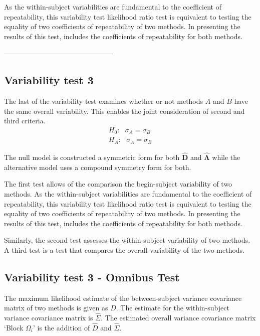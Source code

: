 \documentclass[12pt, a4paper]{report}
\theoremstyle{plain}
\theoremstyle{definition}
\theoremstyle{remark}
\begin{document}
As the within-subject variabilities are fundamental to the coefficient of repeatability, this variability test likelihood ratio test is equivalent to testing the equality of two coefficients of repeatability of two methods. In presenting the results of this test, \citet{roy} includes the coefficients of repeatability for both methods.

-----------------------------------------------%
\subsection{Variability test 3}
The last of the variability test examines whether or not methods $A$ and $B$ have the same overall variability. This enables the joint consideration of second and third criteria.
\begin{eqnarray*}
	H_{0}: \mbox{ }\sigma_{A}  = \sigma_{B} \\
	H_{A}: \mbox{ }\sigma_{A}  = \sigma_{B}
\end{eqnarray*}

The null model is constructed a symmetric form for both $\boldsymbol{\hat{D}}$ and $\boldsymbol{\hat{\Lambda}}$ while the alternative model uses a compound symmetry form for both.






The first test allows of the comparison the begin-subject variability of two methods. As the within-subject variabilities are fundamental to the coefficient of repeatability, this variability test likelihood ratio test is equivalent to testing the equality of two coefficients of repeatability of two methods. In presenting the results of this test, \citet{roy} includes the coefficients of repeatability for both methods.



Similarly, the second test
assesses the within-subject variability of two methods. A third test is a test that compares the overall variability of the two methods.




\subsection{Variability test 3 - Omnibus Test}
The maximum likelihood estimate of the between-subject variance
covariance matrix of two methods is given as $D$. The estimate for
the within-subject variance covariance matrix is $\hat{\Sigma}$.
The estimated overall variance covariance matrix `Block
$\Omega_{i}$' is the addition of $\hat{D}$ and $\hat{\Sigma}$.
\end{document}
